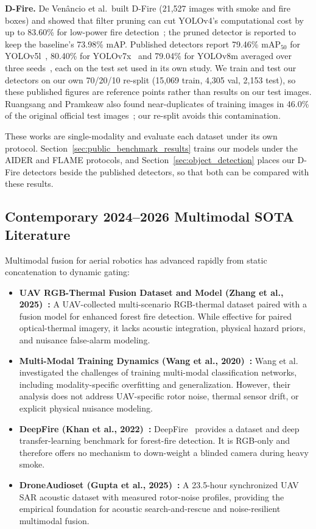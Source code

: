 \textbf{D-Fire.} De Ven\^{a}ncio et al.\ built D-Fire (21{,}527 images with smoke and fire boxes) and showed that filter pruning can cut YOLOv4's computational cost by up to 83.60\% for low-power fire detection~\cite{dfire2022}; the pruned detector is reported to keep the baseline's 73.98\% mAP. Published detectors report 79.46\% $\mathrm{mAP}_{50}$ for YOLOv5l~\cite{venancio2023hybrid}, 80.40\% for YOLOv7x~\cite{goncalves2024yolo} and 79.04\% for YOLOv8m averaged over three seeds~\cite{ruangsang2026crossdataset}, each on the test set used in its own study. We train and test our detectors on our own 70/20/10 re-split (15{,}069 train, 4{,}305 val, 2{,}153 test), so these published figures are reference points rather than results on our test images. Ruangsang and Pramkeaw also found near-duplicates of training images in 46.0\% of the original official test images~\cite{ruangsang2026crossdataset}; our re-split avoids this contamination.

These works are single-modality and evaluate each dataset under its own protocol. Section~\ref{sec:public_benchmark_results} trains our models under the AIDER and FLAME protocols, and Section~\ref{sec:object_detection} places our D-Fire detectors beside the published detectors, so that both can be compared with these results.

\subsection{Contemporary 2024--2026 Multimodal SOTA Literature}

Multimodal fusion for aerial robotics has advanced rapidly from static concatenation to dynamic gating:

\begin{itemize}
    \item \textbf{UAV RGB-Thermal Fusion Dataset and Model (Zhang et al., 2025)~\cite{zhang2025rgbt}:} A UAV-collected multi-scenario RGB-thermal dataset paired with a fusion model for enhanced forest fire detection. While effective for paired optical-thermal imagery, it lacks acoustic integration, physical hazard priors, and nuisance false-alarm modeling.
    \item \textbf{Multi-Modal Training Dynamics (Wang et al., 2020)~\cite{wang2020makes}:} Wang et al.~\cite{wang2020makes} investigated the challenges of training multi-modal classification networks, including modality-specific overfitting and generalization. However, their analysis does not address UAV-specific rotor noise, thermal sensor drift, or explicit physical nuisance modeling.
    \item \textbf{DeepFire (Khan et al., 2022)~\cite{khan2022deepfire}:} DeepFire~\cite{khan2022deepfire} provides a dataset and deep transfer-learning benchmark for forest-fire detection. It is RGB-only and therefore offers no mechanism to down-weight a blinded camera during heavy smoke.
    \item \textbf{DroneAudioset (Gupta et al., 2025)~\cite{gupta2025droneaudioset}:} A 23.5-hour synchronized UAV SAR acoustic dataset with measured rotor-noise profiles, providing the empirical foundation for acoustic search-and-rescue and noise-resilient multimodal fusion.
\end{itemize}

